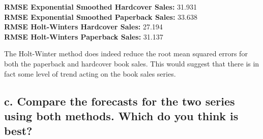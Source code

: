 \documentclass[openany]{book}
\begin{document}
\textbf{RMSE Exponential Smoothed Hardcover Sales:} 31.931\\
\textbf{RMSE Exponential Smoothed Paperback Sales:} 33.638\\
\textbf{RMSE Holt-Winters Hardcover Sales:} 27.194\\
\textbf{RMSE Holt-Winters Paperback Sales:} 31.137

The Holt-Winter method does indeed reduce the root mean squared errors for both the paperback and hardcover book sales. This would suggest that there is in fact some level of trend acting on the book sales series.

\hypertarget{c.-compare-the-forecasts-for-the-two-series-using-both-methods.-which-do-you-think-is-best}{%
\subsection{c. Compare the forecasts for the two series using both methods. Which do you think is best?}\label{c.-compare-the-forecasts-for-the-two-series-using-both-methods.-which-do-you-think-is-best}}
\end{document}
